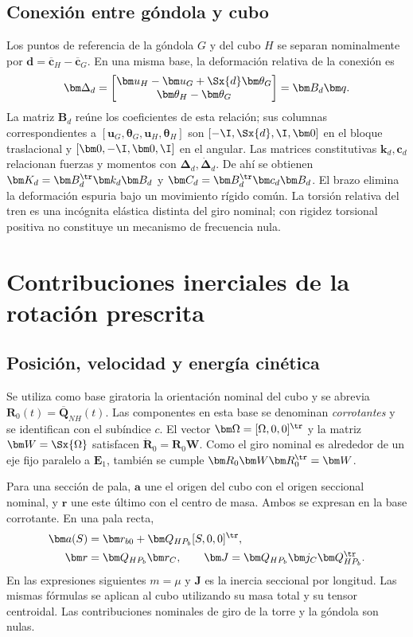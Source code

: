 \subsection{Conexión entre góndola y cubo}
Los puntos de referencia de la góndola $G$ y del cubo $H$ se separan nominalmente por $\bm d=\overline{\bm c}_H-\overline{\bm c}_G$. En una misma base, la deformación relativa de la conexión es
\begin{equation}
\bm\Delta_d=\begin{bmatrix}
\bm u_H-\bm u_G+\Sx{d}\bm\theta_G\\
\bm\theta_H-\bm\theta_G
\end{bmatrix}=\bm B_d\bm q.
\end{equation}
La matriz $\bm B_d$ reúne los coeficientes de esta relación; sus columnas correspondientes a $[\bm u_G,\bm\theta_G,\bm u_H,\bm\theta_H]$ son $[-\I,\Sx{d},\I,\bm0]$ en el bloque traslacional y $[\bm0,-\I,\bm0,\I]$ en el angular. Las matrices constitutivas $\bm k_d,\bm c_d$ relacionan fuerzas y momentos con $\bm\Delta_d,\dot{\bm\Delta}_d$. De ahí se obtienen $\bm K_d=\bm B_d^\tr\bm k_d\bm B_d$ y $\bm C_d=\bm B_d^\tr\bm c_d\bm B_d$. El brazo elimina la deformación espuria bajo un movimiento rígido común. La torsión relativa del tren es una incógnita elástica distinta del giro nominal; con rigidez torsional positiva no constituye un mecanismo de frecuencia nula.

\FloatBarrier
\section{Contribuciones inerciales de la rotación prescrita}
\label{sec:giro}
\subsection{Posición, velocidad y energía cinética}
Se utiliza como base giratoria la orientación nominal del cubo y se abrevia $\bm R_0(t)=\overline{\bm Q}_{NH}(t)$. Las componentes en esta base se denominan \emph{corrotantes} y se identifican con el subíndice $c$. El vector $\bm\Omega=[\Omega,0,0]^\tr$ y la matriz $\bm W=\Sx{\Omega}$ satisfacen $\dot{\bm R}_0=\bm R_0\bm W$. Como el giro nominal es alrededor de un eje fijo paralelo a $\bm E_1$, también se cumple $\bm R_0\bm W\bm R_0^\tr=\bm W$.

Para una sección de pala, $\bm a$ une el origen del cubo con el origen seccional nominal, y $\bm r$ une este último con el centro de masa. Ambos se expresan en la base corrotante. En una pala recta,
\begin{align}
\bm a(S)&=\bm r_{b0}+\bm Q_{HP_b}[S,0,0]^\tr,\nonumber\\
\bm r&=\bm Q_{HP_b}\bm r_C,\qquad
\bm J=\bm Q_{HP_b}\bm j_C\bm Q_{HP_b}^\tr.
\label{eq:datos-giro}
\end{align}
En las expresiones siguientes $m=\mu$ y $\bm J$ es la inercia seccional por longitud. Las mismas fórmulas se aplican al cubo utilizando su masa total y su tensor centroidal. Las contribuciones nominales de giro de la torre y la góndola son nulas.

